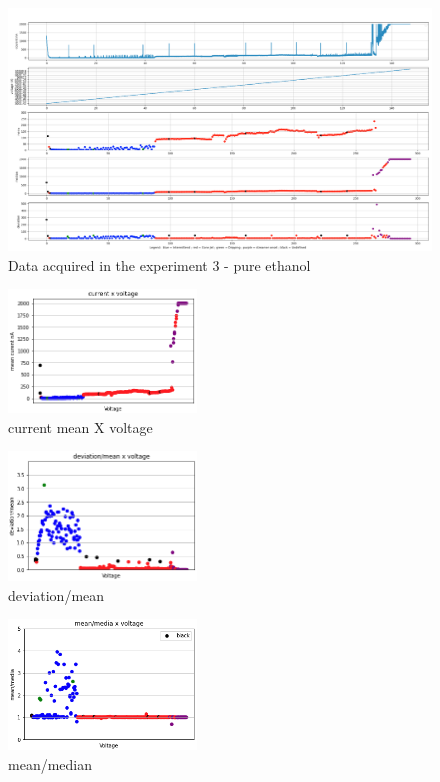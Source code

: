 \begin{figure}[H]
    \center
    \includegraphics[width=18cm]{images/images_folder_3/data4.png}
    \caption{Data acquired in the experiment 3 - pure ethanol}
\end{figure}

\begin{multicols}{3}

    \begin{figure}[H]
        \center
        \includegraphics[width=5cm]{images/images_folder_3/data4_sjaakgraph1.png}
        \caption{current mean X voltage}
    \end{figure}

    \begin{figure}[H]
        \center
        \includegraphics[width=5cm]{images/images_folder_3/data4_sjaakgraph2.png}
        \caption{deviation/mean}
    \end{figure}

    \begin{figure}[H]
        \center
        \includegraphics[width=5cm]{images/images_folder_3/data4_sjaakgraph3.png}
        \caption{mean/median}
    \end{figure}

\end{multicols}




